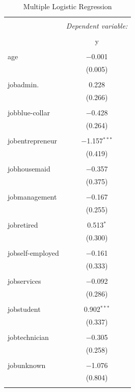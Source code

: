 \documentclass[11pt]{article}
\begin{document}
{%
\begin{longtable}{@{\extracolsep{5pt}}lc} 
  \caption{Multiple Logistic Regression} 
  \label{} 
\\[-1.8ex]\hline 
\hline \\[-1.8ex] 
 & \multicolumn{1}{c}{\textit{Dependent variable:}} \\ 
\cline{2-2} 
\\[-1.8ex] & y \\ 
\hline \\[-1.8ex] 
 age & $-$0.001 \\ 
  & (0.005) \\ 
  & \\ 
 jobadmin. & 0.228 \\ 
  & (0.266) \\ 
  & \\ 
 jobblue-collar & $-$0.428 \\ 
  & (0.264) \\ 
  & \\ 
 jobentrepreneur & $-$1.157$^{***}$ \\ 
  & (0.419) \\ 
  & \\ 
 jobhousemaid & $-$0.357 \\ 
  & (0.375) \\ 
  & \\ 
 jobmanagement & $-$0.167 \\ 
  & (0.255) \\ 
  & \\ 
 jobretired & 0.513$^{*}$ \\ 
  & (0.300) \\ 
  & \\ 
 jobself-employed & $-$0.161 \\ 
  & (0.333) \\ 
  & \\ 
 jobservices & $-$0.092 \\ 
  & (0.286) \\ 
  & \\ 
 jobstudent & 0.902$^{***}$ \\ 
  & (0.337) \\ 
  & \\ 
 jobtechnician & $-$0.305 \\ 
  & (0.258) \\ 
  & \\ 
 jobunknown & $-$1.076 \\ 
  & (0.804) \\ 
  & \\ 

\end{longtable}}
\end{document}
